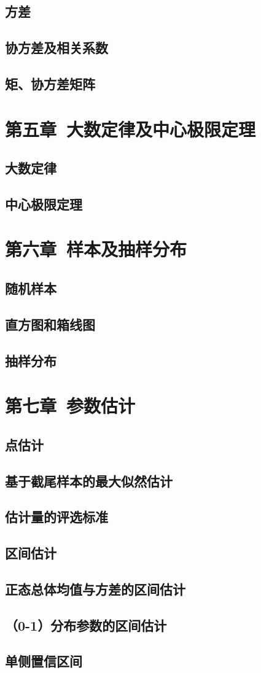 \documentclass[UTF8,10pt]{ctexart}
\begin{document}
	\subsection{方差}
	\subsection{协方差及相关系数}
	\subsection{矩、协方差矩阵}
	\section{第五章\ 大数定律及中心极限定理}
	\subsection{大数定律}
	\subsection{中心极限定理}
	\section{第六章\ 样本及抽样分布}
	\subsection{随机样本}
	\subsection{直方图和箱线图}
	\subsection{抽样分布}
	\section{第七章\ 参数估计}
	\subsection{点估计}
	\subsection{基于截尾样本的最大似然估计}
	\subsection{估计量的评选标准}
	\subsection{区间估计}
	\subsection{正态总体均值与方差的区间估计}
	\subsection{（0-1）分布参数的区间估计}
	\subsection{单侧置信区间}
\end{document}
